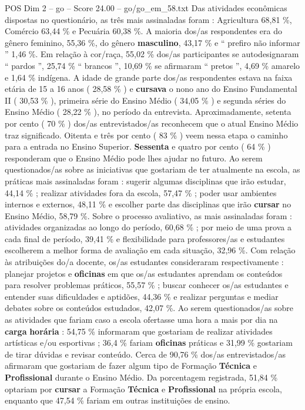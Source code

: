 \begin{textsample}{POS Dim 2 – go – Score 24.00 – go/go\_em\_58.txt}
Das atividades econômicas dispostas no questionário, as três mais assinaladas foram : Agricultura 68,81 \%, Comércio 63,44 \% e Pecuária 60,38 \%.
A maioria dos/as respondentes era do gênero feminino, 55,36 \%, do gênero \textbf{masculino}, 43,17 \% e “ prefiro não informar ” 1,46 \%.
Em relação à cor/raça, 55,02 \% dos/as participantes se autodesignaram “ pardos ”, 25,74 \% “ brancos ”, 10,69 \% se afirmaram “ pretos ”, 4,69 \% amarelo e 1,64 \% indígena.
A idade de grande parte dos/as respondentes estava na faixa etária de 15 a 16 anos ( 28,58 \% ) e \textbf{cursava} o nono ano do Ensino Fundamental II ( 30,53 \% ), primeira série do Ensino Médio ( 34,05 \% ) e segunda séries do Ensino Médio ( 28,22 \% ), no período da entrevista.
Aproximadamente, setenta por cento ( 70 \% ) dos/as entrevistados/as reconhecem que o atual Ensino Médio traz significado.
Oitenta e três por cento ( 83 \% ) veem nessa etapa o caminho para a entrada no Ensino Superior. \textbf{Sessenta} e quatro por cento ( 64 \% ) responderam que o Ensino Médio pode lhes ajudar no futuro.
Ao serem questionados/as sobre as iniciativas que gostariam de ter atualmente na escola, as práticas mais assinaladas foram : sugerir algumas disciplinas que irão estudar, 44,14 \% ; realizar atividades fora da escola, 57,47 \% ; poder usar ambientes internos e externos, 48,11 \% e escolher parte das disciplinas que irão \textbf{cursar} no Ensino Médio, 58,79 \%.
Sobre o processo avaliativo, as mais assinaladas foram : atividades organizadas ao longo do período, 60,68 \% ; por meio de uma prova a cada final de período, 39,41 \% e flexibilidade para professores/as e estudantes escolherem a melhor forma de avaliação em cada situação, 32,96 \%.
Com relação às atribuições do/a docente, os/as estudantes consideraram respectivamente : planejar projetos e \textbf{oficinas} em que os/as estudantes aprendam os conteúdos para resolver problemas práticos, 55,57 \% ; buscar conhecer os/as estudantes e entender suas dificuldades e aptidões, 44,36 \% e realizar perguntas e mediar debates sobre os conteúdos estudados, 42,07 \%.
Ao serem questionados/as sobre as atividades que fariam caso a escola ofertasse uma hora a mais por dia na \textbf{carga} \textbf{horária} : 54,75 \% informaram que gostariam de realizar atividades artísticas e/ou esportivas ; 36,4 \% fariam \textbf{oficinas} práticas e 31,99 \% gostariam de tirar dúvidas e revisar conteúdo.
Cerca de 90,76 \% dos/as entrevistados/as afirmaram que gostariam de fazer algum tipo de Formação \textbf{Técnica} e \textbf{Profissional} durante o Ensino Médio.
Da porcentagem registrada, 51,84 \% optariam por \textbf{cursar} a Formação \textbf{Técnica} e \textbf{Profissional} na própria escola, enquanto que 47,54 \% fariam em outras instituições de ensino.

\end{textsample}
